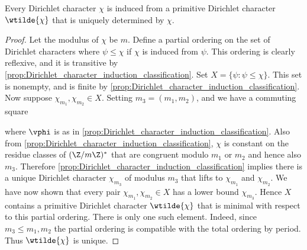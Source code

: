       \begin{theorem}\label{thm:Dirichlet_character_conductor_existance}
        Every Dirichlet character $\chi$ is induced from a primitive Dirichlet character $\wtilde{\chi}$ that is uniquely determined by $\chi$.
      \end{theorem}
      \begin{proof}
        Let the modulus of $\chi$ be $m$. Define a partial ordering on the set of Dirichlet characters where $\psi \le \chi$ if $\chi$ is induced from $\psi$. This ordering is clearly reflexive, and it is transitive by \cref{prop:Dirichlet_character_induction_classification}. Set $X = \{\psi:\psi \le \chi\}$. This set is nonempty, and is finite by \cref{prop:Dirichlet_character_induction_classification}. Now suppose $\chi_{m_{1}},\chi_{m_{2}} \in X$. Setting $m_{3} = (m_{1},m_{2})$, and we have a commuting square
        \begin{center}
        \end{center}
        where $\vphi$ is as in \cref{prop:Dirichlet_character_induction_classification}. Also from \cref{prop:Dirichlet_character_induction_classification}, $\chi$ is constant on the residue classes of $(\Z/m\Z)^{\ast}$ that are congruent modulo $m_{1}$ or $m_{2}$ and hence also $m_{3}$. Therefore \cref{prop:Dirichlet_character_induction_classification} implies there is a unique Dirichlet character $\chi_{m_{3}}$ of modulus $m_{3}$ that lifts to $\chi_{m_{1}}$ and $\chi_{m_{2}}$. We have now shown that every pair $\chi_{m_{1}},\chi_{m_{2}} \in X$ has a lower bound $\chi_{m_{3}}$. Hence $X$ contains a primitive Dirichlet character $\wtilde{\chi}$ that is minimal with respect to this partial ordering. There is only one such element. Indeed, since $m_{3} \le m_{1},m_{2}$ the partial ordering is compatible with the total ordering by period. Thus $\wtilde{\chi}$ is unique.
      \end{proof}

